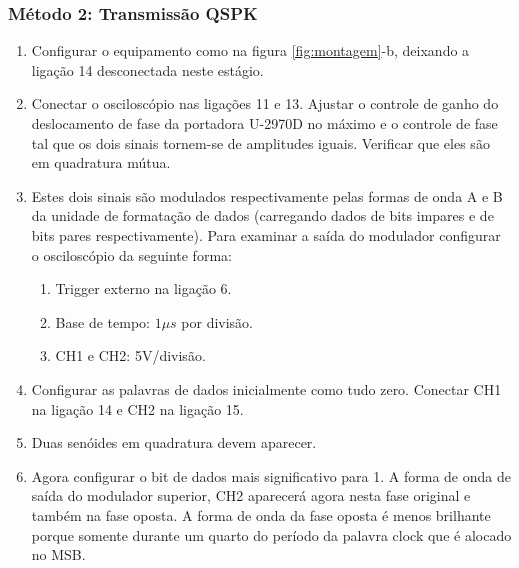         \subsubsection{Método 2: Transmissão QSPK}

                    
            \begin{enumerate}
                \item Configurar o equipamento como na figura \ref{fig:montagem}-b, deixando a ligação 14 desconectada neste estágio. 
                
                \item Conectar o osciloscópio nas ligações 11 e 13. Ajustar o controle de ganho do deslocamento de fase da portadora U-2970D no máximo e o controle de fase tal que os dois sinais tornem-se
                de amplitudes iguais. Verificar que eles são em quadratura mútua.
                
                \item Estes dois sinais são modulados respectivamente pelas formas de onda A e B da unidade de formatação de dados (carregando dados de bits impares e de bits pares respectivamente). Para examinar a saída do modulador configurar o osciloscópio da seguinte forma:
                
                \begin{enumerate}
                  \item Trigger externo na ligação 6.
                  
                  \item Base de tempo: $1\mu s$ por divisão.
                  
                  \item CH1 e CH2: 5V/divisão.
                \end{enumerate}

                \item Configurar as palavras de dados inicialmente como tudo zero. Conectar CH1 na ligação 14 e CH2 na ligação 15.
                
                \item Duas senóides em quadratura devem aparecer.
                
                \item Agora configurar o bit de dados mais significativo para 1. A forma de onda de saída do modulador superior, CH2 aparecerá agora nesta fase original e também na fase oposta. A
                forma de onda da fase oposta é menos brilhante porque somente durante um quarto do período da palavra clock que é alocado no MSB.
                

\end{enumerate}
